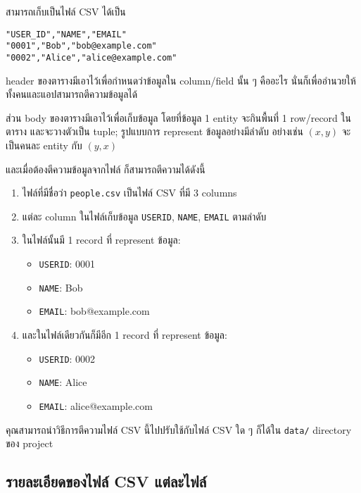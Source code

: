 สามารถเก็บเป็นไฟล์ CSV ได้เป็น

\begin{lstlisting}[caption={\texttt{people.csv}},label={lst:people.csv},numbers=none]
"USER_ID","NAME","EMAIL"
"0001","Bob","bob@example.com"
"0002","Alice","alice@example.com"
\end{lstlisting}

header ของตารางมีเอาไว้เพื่อกำหนดว่าข้อมูลใน column/field นั้น ๆ คืออะไร
นั่นก็เพื่ออำนวยให้ทั้งคนและแอปสามารถตีความข้อมูลได้

ส่วน body ของตารางมีเอาไว้เพื่อเก็บข้อมูล โดยที่ข้อมูล 1 entity จะกินพื้นที่ 1 row/record ในตาราง
และจะวางตัวเป็น tuple; รูปแบบการ represent ข้อมูลอย่างมีลำดับ อย่างเช่น $ (x, y) $ จะเป็นคนละ entity กับ $ (y, x) $

และเมื่อต้องตีความข้อมูลจากไฟล์  ก็สามารถตีความได้ดังนี้

\begin{enumerate}
    \item ไฟล์ที่มีชื่อว่า \texttt{people.csv} เป็นไฟล์ CSV ที่มี 3 columns
    \item แต่ละ column ในไฟล์เก็บข้อมูล \texttt{USER\textunderscore{}ID}, \texttt{NAME}, \texttt{EMAIL} ตามลำดับ
    \item ในไฟล์นั้นมี 1 record ที่ represent ข้อมูล:
        \begin{itemize}
            \item \texttt{USER\textunderscore{}ID}: 0001
            \item \texttt{NAME}: Bob
            \item \texttt{EMAIL}: bob@example.com
        \end{itemize}
    \item และในไฟล์เดียวกันก็มีอีก 1 record ที่ represent ข้อมูล:
        \begin{itemize}
            \item \texttt{USER\textunderscore{}ID}: 0002
            \item \texttt{NAME}: Alice
            \item \texttt{EMAIL}: alice@example.com
        \end{itemize}
\end{enumerate}

คุณสามารถนำวิธีการตีความไฟล์ CSV นี้ไปปรับใช้กับไฟล์ CSV ใด ๆ ก็ได้ใน \texttt{data/} directory ของ project

\subsection{รายละเอียดของไฟล์ CSV แต่ละไฟล์}
\noindent\blindtext[3]
